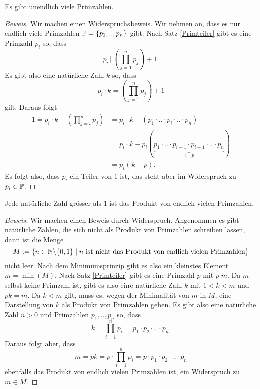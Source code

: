 \begin{thrm}
 Es gibt unendlich viele Primzahlen.
\end{thrm}
\begin{proof}[Beweis] Wir machen einen Widerspruchsbeweis. Wir nehmen an, dass es nur endlich viele Primzahlen $\P=\{p_1,..,p_n\}$ gibt. Nach Satz \ref{Primteiler} gibt es eine Primzahl $p_i$ so, dass
 \[
  p_i\,|\,(\prod_{j=1}^np_j)+1.
 \]
Es gibt also eine natürliche Zahl $k$ so, dass
\[
 p_i\cdot k=(\prod_{j=1}^np_j)+1
\]
gilt. Daraus folgt
\begin{align*}
 1=p_i\cdot k-(\prod_{j=i}^np_j)&=p_i\cdot k-(p_1\cdot..\cdot p_i\cdot..\cdot p_n)\\
&=p_i\cdot k-p_i(\underbrace{p_1\cdot..\cdot p_{i-1}\cdot p_{i+1}\cdot..\cdot p_n}_{:=p})\\
&=p_i(k-p).
\end{align*}
Es folgt also, dass $p_i$ ein Teiler von $1$ ist, das steht aber im Widerspruch zu $p_i\in\P$.
\end{proof}

%
%



\begin{thrm}\label{primfaktor1}
 Jede natürliche Zahl grösser als $1$ ist das Produkt von endlich vielen Primzahlen.
\end{thrm}
\begin{proof}[Beweis]
 Wir machen einen Beweis durch Widerspruch. Angenommen es gibt natürliche Zahlen, die sich nicht als Produkt von Primzahlen schreiben lassen, dann ist die Menge
\[
 M:=\{n\in\N\backslash\{0,1\}\mid n\text{ ist nicht das Produkt von endlich vielen Primzahlen}\}
\]
nicht leer. Nach dem Minimumsprinzip gibt es also ein kleinstes Element $m=\min(M)$. Nach Satz \ref{Primteiler} gibt es eine Primzahl $p$ mit $p|m$. Da $m$ selbst keine Primzahl ist, gibt es also eine natürliche Zahl $k$ mit $1<k<m$ und $pk=m$. Da $k<m$ gilt, muss es, wegen der Minimalität von $m$ in $M$, eine Darstellung von $k$ als Produkt von Primzahlen geben. Es gibt also eine natürliche Zahl $n>0$ und Primzahlen $p_1,..,p_n$ so, dass
\[
k=\prod_{i=1}^{n}p_i=p_1\cdot p_2\cdot..\cdot p_n.
\]
Daraus folgt aber, dass
\[
 m=pk=p\cdot\prod_{i=1}^{n}p_i=p\cdot p_1\cdot p_2\cdot..\cdot p_n
\]
ebenfalls das Produkt von endlich vielen Primzahlen ist, ein Widerspruch zu $m\in M$.
\end{proof}

